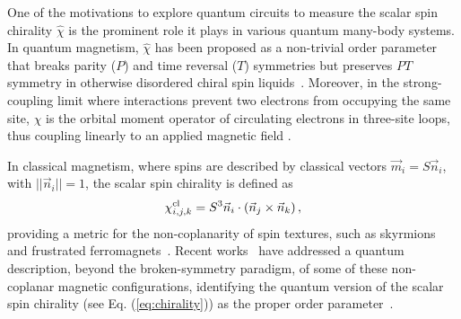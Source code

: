 \documentclass[aps,prl,twocolumn]{revtex4}
\begin{document}

One of the motivations to explore quantum circuits to measure the scalar spin chirality  $\hat{\chi}$ is the prominent role it plays in various quantum many-body systems. In quantum magnetism, $\hat{\chi}$ has been proposed as a non-trivial order parameter that breaks parity ($P$) and time reversal ($T$) symmetries but preserves $PT$ symmetry in otherwise disordered chiral spin liquids~\cite{wen1989}. Moreover, in the strong-coupling limit where interactions prevent two electrons from occupying the same site, $\hat{\chi}$ is the orbital moment operator of circulating electrons in three-site loops, thus coupling linearly to an applied magnetic field \cite{sen95}.

In classical magnetism, where spins are described by classical vectors $\vec{m}_i=S\vec{n}_i$, with $||\vec{n}_i|| = 1$, %
the   scalar spin chirality is defined as
\begin{equation}
    \chi^{\rm cl}_{i,j,k} = S^3
    \vec{n}_i\cdot\left(\vec{n}_j\times\vec{n}_k\right),
\label{eq:clchir}
\end{equation}
providing a metric for the non-coplanarity of spin textures, such as  skyrmions~\cite{fert17} and frustrated ferromagnets~\cite{taguchi01}.
Recent works~\cite{roldan15,gauyacq19,ochoa19,sotnikov21,mazurenko23} have addressed a quantum description, beyond the broken-symmetry paradigm, of some of these non-coplanar magnetic configurations, identifying the quantum version of the scalar spin chirality (see Eq. (\ref{eq:chirality})) as the proper order parameter~\cite{sotnikov21}. 
\end{document}
